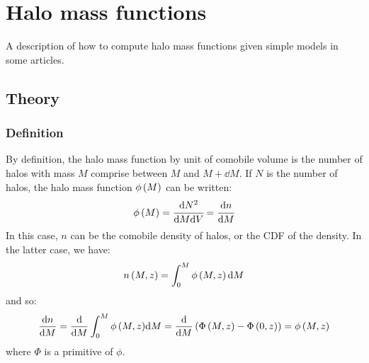 \chapter{Halo mass functions}
%
A description of how to compute halo mass functions given simple models in some
articles.
%
\section{Theory}
%
\subsection{Definition}
%
By definition, the halo mass function by unit of comobile volume is the number
of halos with mass $M$ comprise between $M$ and $M+\dd{M}$. If $N$ is the
number of halos, the halo mass function $\phi\left({M}\right)$ can be written:
%
\begin{equation}
    \phi\left({M}\right)=\cfrac{{\rm{d}}{N^2}}{{\rm{d}}{M}{\rm{d}}{V}}=\cfrac{{\rm{d}}{n}}{{\rm{d}}{M}}
\end{equation}
%
In this case, $n$ can be the comobile density of halos, or the CDF of the
density. In the latter case, we have:
%
\begin{equation}
    n\left({M,z}\right)=\int_0^M{\phi\left({M,z}\right){\rm{d}}{M}}
\end{equation}
%
and so:
%
\begin{equation}
    \frac{{\rm{d}}{n}}{{\rm{d}}{M}}=\frac{{\rm{d}}}{{\rm{d}}{M}}\int_0^M{\phi\left({M,z}\right)}{\rm{d}}{M}=\frac{{\rm{d}}}{{\rm{d}}{M}}\left({\Phi\left({M,z}\right)}-{\Phi\left({0,z}\right)}\right)={\phi\left({M,z}\right)}
\end{equation}
%
where $\Phi$ is a primitive of $\phi$.
%
